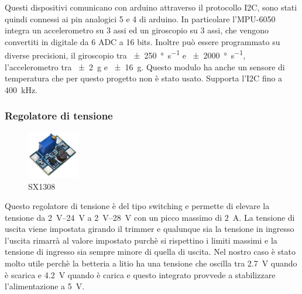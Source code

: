 \documentclass[10pt,a4paper]{article}
\begin{document}
Questi dispositivi comunicano con arduino attraverso il protocollo I2C, sono stati quindi connessi ai pin analogici 5 e 4 di arduino.
In particolare l'MPU-6050 integra un accelerometro su 3 assi ed un giroscopio su 3 assi, che vengono convertiti in digitale da 6 ADC a 16 bits. Inoltre pu\`o essere programmato su diverse precisioni, il giroscopio tra \SI[per-mode = symbol]{+-250}{\degree\per\second} e \SI[per-mode = symbol]{+-2000}{\degree\per\second}, l'accelerometro tra \SI[per-mode = symbol]{+-2}{g} e \SI[per-mode = symbol]{+-16}{g}. Questo modulo ha anche un sensore di temperatura che per questo progetto non \`e  stato usato. Supporta l'I2C fino a \SI{400}{\kilo \hertz}.

\subsubsection{Regolatore di tensione}
\begin{figure}
	\centering
	\vspace{-30pt}
	\includegraphics[width=0.2\textwidth]{DC-DC_sx1308.jpg}
	\vspace{-20pt}
	\caption{SX1308}
	\label{fig:sx1308}
\end{figure}
Questo regolatore di tensione \`e del tipo switching e permette di elevare la tensione da \SIrange{2}{24}{\volt} a \SIrange{2}{28}{\volt} con un picco massimo di \SI{2}{\ampere}. La tensione di uscita viene impostata girando il trimmer e qualunque sia la tensione in ingresso l'uscita rimarr\`a al valore impostato purch\`e si rispettino i limiti massimi e la tensione di ingresso sia sempre minore di quella di uscita. Nel nostro caso \`e stato molto utile perch\`e la betteria a litio ha una tensione che oscilla tra \SI{2.7}{\volt} quando \`e scarica e \SI{4.2}{\volt} quando \`e carica e questo integrato provvede a stabilizzare l'alimentazione a \SI{5}{\volt}.
\end{document}
